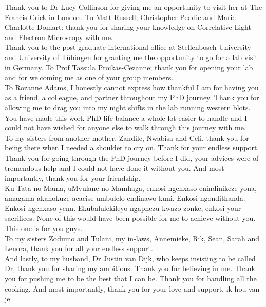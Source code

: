 \noindent
Thank you to Dr Lucy Collinson for giving me an opportunity to visit her at The Francis Crick in London. To Matt Russell, Christopher Peddie and Marie-Charlotte Domart: thank you for sharing your knowledge on Correlative Light and Electron Microscopy with me. \\

\noindent
Thank you to the post graduate international office at Stellenbosch University and University of T{\"u}bingen for granting me the opportunity to go for a lab visit in Germany. To Prof Tassula Proikas-Cezanne; thank you for opening your lab and for welcoming me as one of your group members.\\

\noindent
To Rozanne Adams, I honestly cannot express how thankful I am for having you as a friend, a colleague, and partner throughout my PhD journey. Thank you for allowing me to drag you into my night shifts in the lab running western blots. You have made this work-PhD life balance a whole lot easier to handle and I could not have wished for anyone else to walk through this journey with me.\\

\noindent
To my sisters from another mother, Zandile, Nwabisa and Celi, thank you for being there when I needed a shoulder to cry on. Thank for your endless support. Thank you for going through the PhD journey before I did, your advices were of tremendous help and I could not have done it without you. And most importantly, thank you for your friendship.\\

\noindent
Ku Tata no Mama,  uMvulane no Mamhaga, enkosi ngenxaso enindinikeze yona, amagama akanokuze acacise umbulelo endinawo kuni. Enkosi ngondithanda. Enkosi ngenxaso yenu. Ekubalulekileyo ngaphezu kwazo zonke, enkosi your sacrifices. None of this would have been possible for me to achieve without you. This one is for you guys.\\

\noindent
To my sisters Zodumo and Tulani, my in-laws, Annemieke, Rik, Sean, Sarah and Lenora, thank you for all your endless support.\\

\noindent
And lastly, to my husband, Dr Justin van Dijk, who keeps insisting to be called Dr, thank you for sharing my ambitions. Thank you for believing in me. Thank you for pushing me to be the best that I can be. Thank you for handling all the cooking. And most importantly, thank you for your love and support. ik hou van je\\

